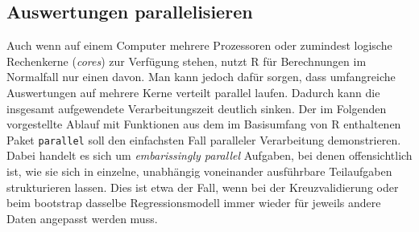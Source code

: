 \subsection{Auswertungen parallelisieren}
\label{sec:parallel}


Auch wenn auf einem Computer mehrere Prozessoren oder zumindest logische Rechenkerne (\emph{cores}) zur Verfügung stehen, nutzt R für Berechnungen im Normalfall nur einen davon. Man kann jedoch dafür sorgen, dass umfangreiche Auswertungen auf mehrere Kerne verteilt parallel laufen. Dadurch kann die insgesamt aufgewendete Verarbeitungszeit deutlich sinken. Der im Folgenden vorgestellte Ablauf mit Funktionen aus dem im Basisumfang von R enthaltenen Paket \lstinline!parallel! soll den einfachsten Fall paralleler Verarbeitung demonstrieren. Dabei handelt es sich um \emph{embarissingly parallel} Aufgaben, bei denen offensichtlich ist, wie sie sich in einzelne, unabhängig voneinander ausführbare Teilaufgaben strukturieren lassen. Dies ist etwa der Fall, wenn bei der Kreuzvalidierung oder beim bootstrap dasselbe Regressionsmodell immer wieder für jeweils andere Daten angepasst werden muss.

